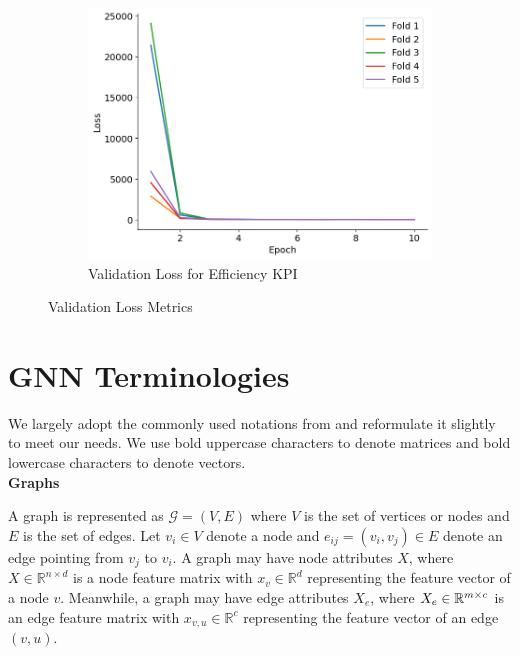 \documentclass{report} %
\begin{document}
\begin{figure}[H]
\begin{subfigure}{0.32\textwidth}
        \centering
        \includegraphics[width=\textwidth]{./ReportImages/val_loss_y2.png}
        \caption{\centering Validation Loss for Efficiency \ac{KPI}}
        \label{fig:Validation Loss for Efficiency grid}
    \end{subfigure}
    \caption{Validation Loss Metrics}
    \label{fig:Validation Loss Metrics}
\end{figure}

\section{GNN Terminologies}
\label{sec:GNN Terminologies}

We largely adopt the commonly used notations from \cite{GNN-2019} and reformulate it slightly to meet our needs.
We use bold uppercase characters to denote matrices and bold lowercase characters to denote vectors.\\

\textbf{Graphs}

A graph is represented as \( \mathcal{G} = (V, E) \) where \( V \) is the set of vertices or nodes  and \( E \) is the set of edges. 
Let \( v_i \in V \) denote a node and \( e_{ij} = (v_i, v_j) \in E \) denote an edge pointing from \( v_j \) to \( v_i \).
A graph may have node attributes \( X \), where \( X \in \mathbb{R}^{n \times d} \) is a node feature matrix with 
\( x_v \in \mathbb{R}^d \) representing the feature vector of a node \( v \). 
Meanwhile, a graph may have edge attributes \( X_e \), where \( X_e \in \mathbb{R}^{m \times \\c} \) is an edge
feature matrix with \( x_{v,u} \in \mathbb{R}^c \) representing the feature vector of an edge \( (v, u) \).\\
\end{document}
